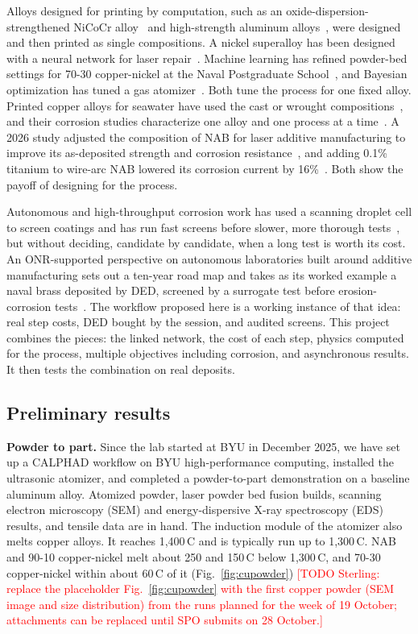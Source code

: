 \documentclass[12pt,letterpaper]{article}
\newcommand{\todo}[1]{\textcolor{red}{[TODO Sterling: #1]}}
\begin{document}
Alloys designed for printing by computation, such as an
oxide-dispersion-strengthened NiCoCr alloy~\cite{smith2023} and
high-strength aluminum alloys~\cite{thapliyal2020,taheri2025}, were designed
and then printed as single compositions. A nickel superalloy has been
designed with a neural network for laser repair~\cite{markanday2022}.
Machine learning has refined powder-bed settings for 70-30 copper-nickel at
the Naval Postgraduate School~\cite{sparrow2026}, and Bayesian optimization
has tuned a gas atomizer~\cite{tamura2021}. Both tune the process for one
fixed alloy. Printed copper alloys for seawater have used the cast or wrought
compositions~\cite{milprf32816,milprf32804,milprf32815}, and their corrosion
studies characterize one alloy and one process at a
time~\cite{morshed2024,cai2023,song2024,nadimi2025}. A 2026 study adjusted
the composition of NAB for laser additive manufacturing to improve its
as-deposited strength and corrosion resistance~\cite{jia2026}, and adding
0.1\% titanium to wire-arc NAB lowered its corrosion current by
16\%~\cite{zhang2026}. Both show the payoff of designing for the process.

Autonomous and high-throughput corrosion work has used a scanning droplet
cell to screen coatings and has run fast screens before slower, more thorough
tests~\cite{decost2022,sur2023}, but without deciding, candidate by
candidate, when a long test is worth its cost. An ONR-supported perspective
on autonomous laboratories built around additive manufacturing sets out a
ten-year road map and takes as its worked example a naval brass deposited by
DED, screened by a surrogate test before erosion-corrosion
tests~\cite{collins2026}. The workflow proposed here is a working instance of
that idea: real step costs, DED bought by the session, and audited
screens. This project combines the pieces: the linked network, the
cost of each step, physics computed for the process, multiple objectives
including corrosion, and asynchronous results. It then tests the combination
on real deposits.

\subsection{Preliminary results}
\label{sec:prelim}

\textbf{Powder to part.} Since the lab started at BYU in December 2025, we
have set up a CALPHAD workflow on BYU high-performance computing, installed
the ultrasonic atomizer, and completed a powder-to-part demonstration on a
baseline aluminum alloy. Atomized powder, laser powder bed fusion builds,
scanning electron microscopy (SEM) and energy-dispersive X-ray spectroscopy
(EDS) results, and tensile data are in hand.
The induction module of the atomizer also melts copper alloys. It reaches 1,400\,\textdegree{}C and is typically run up to 1,300\,\textdegree{}C.
NAB and 90-10 copper-nickel melt about 250 and 150\,\textdegree{}C below 1,300\,\textdegree{}C, and 70-30 copper-nickel within about 60\,\textdegree{}C of it (Fig.~\ref{fig:cupowder}) \todo{replace the placeholder Fig.~\ref{fig:cupowder} with the first copper powder (SEM image and size distribution) from the
runs planned for the week of 19 October; attachments can be replaced until
SPO submits on 28 October.}
\end{document}
